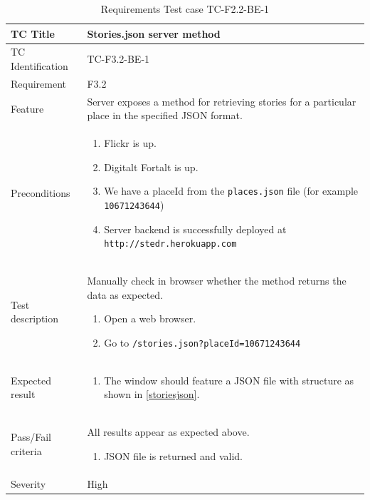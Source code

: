 \documentclass[11pt]{book}
\begin{document}
\begin{table}
  \begin{tabular}{| p{3cm} | p{9.5cm} |} \hline 
    TC Title              & Stories.json server method \\ \hline 
    TC Identification     & TC-F3.2-BE-1 \\ \hline 
    Requirement           & F3.2 \\ \hline 
    Feature               & Server exposes a method for retrieving stories for a particular place in the specified JSON format. \\ \hline 
    Preconditions         & \begin{enumerate}
                              \item Flickr is up.
                              \item Digitalt Fortalt is up.
                              \item We have a placeId from the \texttt{places.json} file (for example \texttt{10671243644})
                              \item Server backend is successfully deployed at \texttt{http://stedr.herokuapp.com}
                            \end{enumerate} \\ \hline 

    Test description      & Manually check in browser whether the method returns the data as expected.

                            \begin{enumerate}
                              \item Open a web browser.
                              \item Go to \texttt{/stories.json?placeId=10671243644}
                            \end{enumerate} \\ \hline 
    Expected result       & \begin{enumerate}
                              \item The window should feature a JSON file with structure as shown in \ref{storiesjson}.
                            \end{enumerate} \\ \hline 
    Pass/Fail criteria    & All results appear as expected above.
                            \begin{enumerate}
                              \item JSON file is returned and valid.
                            \end{enumerate} \\ \hline 
    Severity              & High \\ \hline 
  \end{tabular}
  \caption{Requirements Test case TC-F2.2-BE-1}
  \label{tab:TCF3.2BE1}
\end{table}
\end{document}
